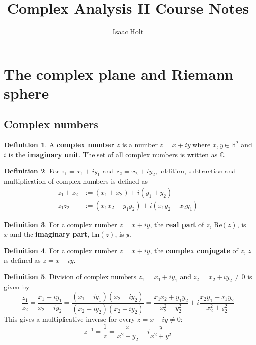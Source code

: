 \documentclass[12pt,a4paper]{article}
\title{Complex Analysis II Course Notes}
\author{Isaac Holt}
\theoremstyle{definition}
\newtheorem{definition}{Definition}[subsection]
\begin{document}
\maketitle

\section{The complex plane and Riemann sphere}

\subsection{Complex numbers}

\begin{definition}
	A \textbf{complex number} $z$ is a number $z = x + iy$ where $x, y \in \mathbb{R}^2$ and $i$ is the \textbf{imaginary unit}. The set of all complex numbers is written as $\mathbb{C}$.
\end{definition}

\begin{definition}
	For $z_1 = x_1 + i y_1$ and $z_2 = x_2 + i y_2$, addition, subtraction and multiplication of complex numbers is defined as
	\[
		\begin{aligned}
			z_1 \pm z_2 & := (x_1 \pm x_2) + i (y_1 \pm y_2) \\
			z_1 z_2 & := (x_1 x_2 - y_1 y_2) + i (x_1 y_2 + x_2 y_1)
		\end{aligned}
	\]
\end{definition}

\begin{definition}
	For a complex number $z = x + iy$, the \textbf{real part} of $z$, $\text{Re}(z)$, is $x$ and the \textbf{imaginary part}, $\text{Im}(z)$, is $y$.
\end{definition}

\begin{definition}
	For a complex number $z = x + iy$, the \textbf{complex conjugate} of $z$, $\overline{z}$ is defined as $\overline{z} = x - iy$.
\end{definition}

\begin{definition}
	Division of complex numbers $z_1 = x_1 + i y_1$ and $z_2 = x_2 + i y_2 \ne 0$ is given by
	\[
		\frac{z_1}{z_2} = \frac{x_1 + i y_1}{x_2 + i y_2} = \frac{(x_1 + i y_1) (x_2 - i y_2)}{(x_2 + i y_2) (x_2 - i y_2)} = \frac{x_1 x_2 + y_1 y_2}{x_2^2 + y_2^2} + i \frac{x_2 y_1 - x_1 y_2}{x_2^2 + y_2^2}
	\]
	This gives a multiplicative inverse for every $z = x + iy \ne 0$:
	\[
		z^{-1} = \frac{1}{z} = \frac{x}{x^2 + y_2} - i \frac{y}{x^2 + y^2}
	\]
\end{definition}
\end{document}
